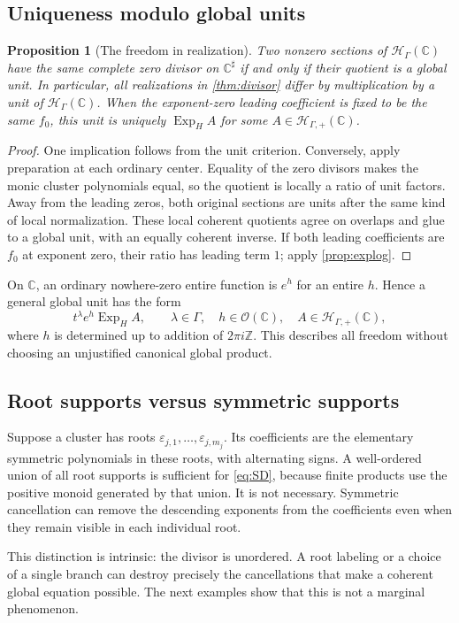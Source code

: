 \documentclass[11pt,letterpaper]{article}
\newtheorem{proposition}[proposition]{Proposition}
\theoremstyle{definition}
\theoremstyle{remark}
\newcommand{\C}{\mathbb C}
\newcommand{\Z}{\mathbb Z}
\newcommand{\OO}{\mathcal O}
\newcommand{\HH}{\mathscr H_\Gamma}
\newcommand{\HP}{\mathscr H_{\Gamma,+}}
\newcommand{\sh}{^{\sharp}}
\newcommand{\ExpH}{\operatorname{Exp}_{H}}
\numberwithin{equation}{section}
\begin{document}
\subsection{Uniqueness modulo global units}
\begin{proposition}[The freedom in realization]\label{prop:realizationtorsor}
Two nonzero sections of $\HH(\C)$ have the same complete zero divisor on $\C\sh$ if and only if their quotient is a global unit. In particular, all realizations in \cref{thm:divisor} differ by multiplication by a unit of $\HH(\C)$. When the exponent-zero leading coefficient is fixed to be the same $f_0$, this unit is uniquely $\ExpH A$ for some $A\in\HP(\C)$.
\end{proposition}
\begin{proof}
One implication follows from the unit criterion. Conversely, apply preparation at each ordinary center. Equality of the zero divisors makes the monic cluster polynomials equal, so the quotient is locally a ratio of unit factors. Away from the leading zeros, both original sections are units after the same kind of local normalization. These local coherent quotients agree on overlaps and glue to a global unit, with an equally coherent inverse. If both leading coefficients are $f_0$ at exponent zero, their ratio has leading term $1$; apply \cref{prop:explog}.
\end{proof}
On $\C$, an ordinary nowhere-zero entire function is $e^h$ for an entire $h$. Hence a general global unit has the form
\[
 t^\lambda e^h\ExpH A,
 \qquad \lambda\in\Gamma,\quad h\in\OO(\C),\quad A\in\HP(\C),
\]
where $h$ is determined up to addition of $2\pi i\Z$. This describes all freedom without choosing an unjustified canonical global product.

\subsection{Root supports versus symmetric supports}
Suppose a cluster has roots $\varepsilon_{j,1},\ldots,\varepsilon_{j,m_j}$. Its coefficients are the elementary symmetric polynomials in these roots, with alternating signs. A well-ordered union of all root supports is sufficient for \eqref{eq:SD}, because finite products use the positive monoid generated by that union. It is not necessary. Symmetric cancellation can remove the descending exponents from the coefficients even when they remain visible in each individual root.

This distinction is intrinsic: the divisor is unordered. A root labeling or a choice of a single branch can destroy precisely the cancellations that make a coherent global equation possible. The next examples show that this is not a marginal phenomenon.
\end{document}
